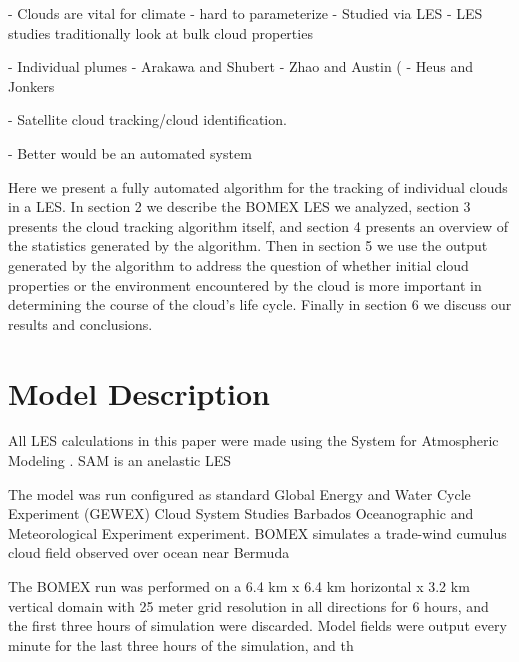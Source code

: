 \documentclass[acp]{copernicus}
\begin{document}

\introduction

- Clouds are vital for climate
- hard to parameterize
- Studied via LES
- LES studies traditionally look at bulk cloud properties

- Individual plumes
- Arakawa and Shubert
- Zhao and Austin (
- Heus and Jonkers

- Satellite cloud tracking/cloud identification.

- Better would be an automated system

Here we present a fully automated algorithm for the tracking of individual 
clouds in a LES.  In section 2 we describe the BOMEX LES we analyzed, section 
3 presents the cloud tracking algorithm itself, and section 4 presents an 
overview of the statistics generated by the algorithm.  Then in section 5 we 
use the output generated by the algorithm to address the question of whether 
initial cloud properties or the environment encountered by the cloud is more 
important in determining the course of the cloud's life cycle.  Finally in 
section 6 we discuss our results and conclusions.


\section{Model Description}

All LES calculations in this paper were made using the System for Atmospheric 
Modeling \citep[SAM;][]{Khairoutdinov2003}.  SAM is an anelastic LES 

The model was run configured as standard Global Energy and Water Cycle 
Experiment (GEWEX) Cloud System Studies \citep[GCSS;][]{Randall2003} Barbados 
Oceanographic and Meteorological Experiment \citep[BOMEX;][]{Siebesma2003} 
experiment.  BOMEX simulates a trade-wind cumulus cloud field observed over 
ocean near Bermuda

The BOMEX run was performed on a 6.4 km x 6.4 km horizontal x 3.2 km vertical 
domain with 25 meter grid resolution in all directions for 6 hours, and the 
first three hours of simulation were discarded.  Model fields were output every 
minute for the last three hours of the simulation, and th

\end{document}
